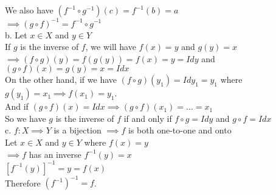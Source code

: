 We also have $(f^{-1}\circ g^{-1})(c)=f^{-1}(b)=a$\\
$\implies (g\circ f)^{-1}=f^{-1}\circ g^{-1}$\\
b. Let $x\in X$ and $y\in Y$\\
If $g$ is the inverse of $f$, we will have $f(x)=y$ and $g(y)=x$\\
$\implies (f\circ g)(y)=f(g(y))=f(x)=y=Idy$ and $(g\circ f)(x)=g(y)=x=Idx$\\
On the other hand, if we have $(f\circ g)(y_1)=Idy_1=y_1$ where $g(y_1)=x_1 \implies f(x_1)=y_1$.\\
And if $(g\circ f)(x)=Idx \implies (g\circ f)(x_1)=...=x_1$\\
So we have $g$ is the inverse of $f$ if and only if $f\circ g=Idy$ and $g\circ f=Idx$\\
c. $f: X\implies Y$ is a bijection $\implies f$ is both one-to-one and onto\\
Let $x\in X$ and $y\in Y$ where $f(x)=y$\\
$\implies f$ has an inverse $f^{-1}(y)=x$\\
$[f^{-1}(y)]^{-1}=y=f(x)$\\
Therefore $(f^{-1})^{-1}=f$.\\